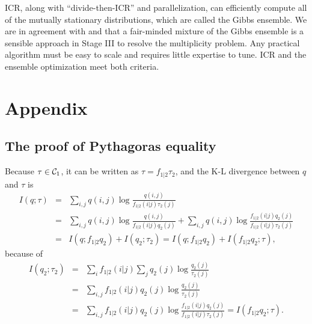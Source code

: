 \documentclass[12pt,a4paper]{article}
\begin{document}
ICR, along with ``divide-then-ICR'' and parallelization, can efficiently compute all of the mutually stationary distributions, which are called the Gibbs ensemble.
We are in agreement with \citet{Breiman2001} and \citet{Chen2013} that a fair-minded mixture of the Gibbs ensemble is a sensible approach in {\sf Stage III} to resolve the multiplicity problem.
Any practical algorithm must be  easy to scale and  requires little expertise to tune. ICR and  the ensemble optimization  meet both criteria.

\section*{Appendix}
\renewcommand{\thesubsection}{\Alph{subsection}}
\setcounter{subsection}{0}
\subsection{The proof of Pythagoras equality}\label{app1}
Because $\tau \in {\cal C}_1$, it can be written as $\tau=f_{1|2}\tau_2$, and
the K-L divergence between $q$ and $\tau$ is
\begin{eqnarray*}
I(q;\tau)
&=&\sum_{i,j} q(i,j) \log \frac {q(i,j)}
{f_{1|2}(i|j)\tau_2(j)}\\
&=&\sum_{i,j} q(i,j) \log \frac {q(i,j)}
{f_{1|2}(i|j)q_2(j)}+
\sum_{i,j} q(i,j) \log \frac {f_{1|2}(i|j)q_2(j)}{f_{1|2}(i|j)\tau_2(j)}\\
&=& I(q; f_{1|2}q_2) + I(q_2;\tau_2)=I(q; f_{1|2}q_2) + I(f_{1|2}q_2;\tau),
\end{eqnarray*}
because of
\begin{eqnarray*}
I(q_2;\tau_2)
&=& \sum_i f_{1|2}(i|j) \sum_j q_2(j) \log \frac{q_2(j)}{\tau_2(j)}\\
&=& \sum_{i,j}f_{1|2}(i|j)q_2(j) \log \frac{q_2(j)}{\tau_2(j)} \\
&=& \sum_{i,j}f_{1|2}(i|j)q_2(j) \log \frac{f_{1|2}(i|j)q_2(j)}{f_{1|2}(i|j)\tau_2(j)}=I(f_{1|2}q_2;\tau).
\end{eqnarray*}

\bigskip
\end{document}
